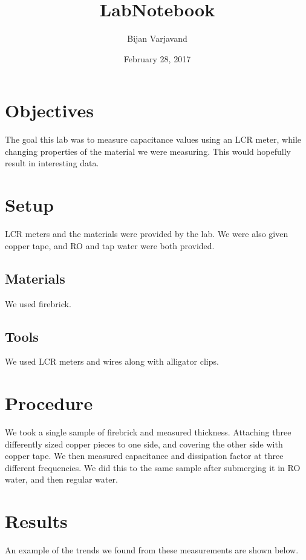 \documentclass{article}
\author{Bijan Varjavand}
\title{LabNotebook}
\date{February 28, 2017}
\begin{document}
\maketitle

\section{Objectives}

The goal this lab was to measure capacitance values using an LCR meter, while changing properties of the material we were measuring. This would hopefully result in interesting data.

\section{Setup}

LCR meters and the materials were provided by the lab. We were also given copper tape, and RO and tap water were both provided.

\subsection{Materials}

We used firebrick.

\subsection{Tools}

We used LCR meters and wires along with alligator clips.

\section{Procedure}

We took a single sample of firebrick and measured thickness. Attaching three differently sized copper pieces to one side, and covering the other side with copper tape. We then measured capacitance and dissipation factor at three different frequencies. We did this to the same sample after submerging it in RO water, and then regular water.

\section{Results}

An example of the trends we found from these measurements are shown below.
\end{document}
